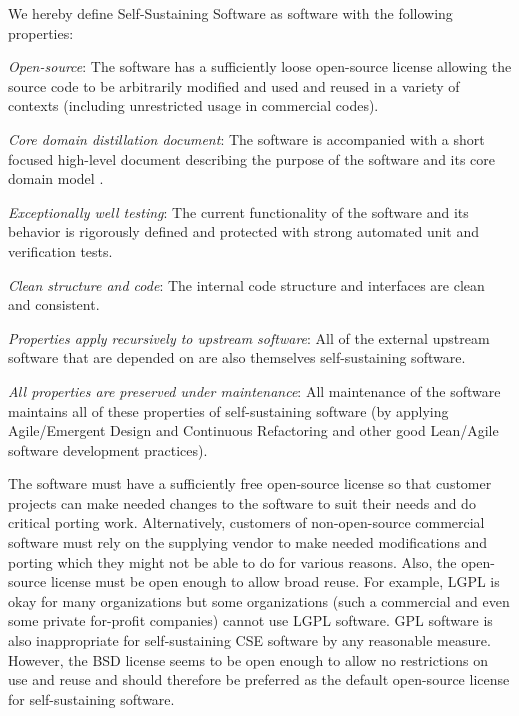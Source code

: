 \documentclass[11pt]{SANDreport}
\begin{document}
We hereby define Self-Sustaining Software as software with the
following properties:
%
\begin{compactitem}

{}\item\textit{Open-source}: The software has a sufficiently loose
open-source license allowing the source code to be arbitrarily modified
and used and reused in a variety of contexts (including unrestricted
usage in commercial codes).

{}\item\textit{Core domain distillation document}: The software is
accompanied with a short focused high-level document describing the
purpose of the software and its core domain model
{}\cite{DomainDrivenDesign}.

{}\item\textit{Exceptionally well testing}: The current functionality
of the software and its behavior is rigorously defined and protected
with strong automated unit and verification tests.

{}\item\textit{Clean structure and code}: The internal code structure
and interfaces are clean and consistent.

{}\item\textit{Properties apply recursively to upstream software}: All
of the external upstream software that are depended on are also
themselves self-sustaining software.

{}\item\textit{All properties are preserved under maintenance}: All
maintenance of the software maintains all of these properties of
self-sustaining software (by applying Agile/Emergent Design and
Continuous Refactoring and other good Lean/Agile software development
practices).

\end{compactitem}

The software must have a sufficiently free open-source license so that
customer projects can make needed changes to the software to suit
their needs and do critical porting work.  Alternatively, customers of
non-open-source commercial software must rely on the supplying vendor
to make needed modifications and porting which they might not be able
to do for various reasons.  Also, the open-source license must be open
enough to allow broad reuse.  For example, LGPL is okay for many
organizations but some organizations (such a commercial and even some
private for-profit companies) cannot use LGPL software.  GPL software
is also inappropriate for self-sustaining CSE software by any
reasonable measure.  However, the BSD license seems to be open enough
to allow no restrictions on use and reuse and should therefore be
preferred as the default open-source license for self-sustaining
software.
\end{document}
